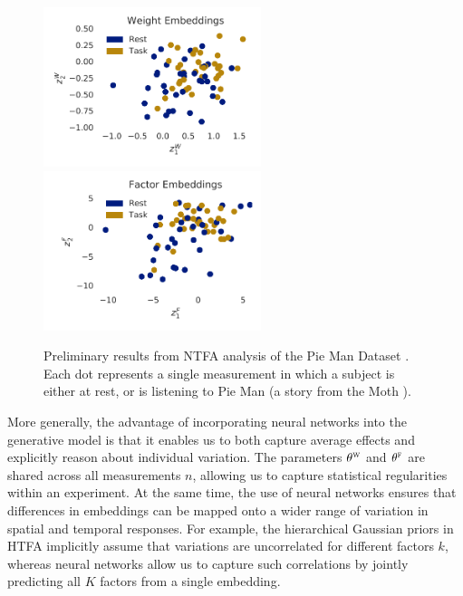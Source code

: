 \documentclass{article}
\newcommand{\scf}{\textsc{f}}
\newcommand{\scw}{\textsc{w}}
\begin{document}
\begin{figure}[!t]
    \begin{center}
    \includegraphics[width=2.5in]{figures/embedding_z_w_rest_intact.pdf}
    \hspace{4ex}
    \includegraphics[width=2.5in]{figures/embedding_z_f_rest_intact.pdf}
    \end{center}
    \vspace{-15pt}
    \caption{\label{fig:pieman} Preliminary results from NTFA analysis of the Pie Man Dataset \cite{simony2016dynamic}. Each dot represents a single measurement in which a subject is either at rest, or is listening to Pie Man (a story from the Moth \cite{pieman}).}
\end{figure}


More generally, the advantage of incorporating neural networks into the generative model is that it enables us to both capture average effects and explicitly reason about individual variation. The parameters $\theta^\scw$ and $\theta^\scf$ are shared across all measurements $n$, allowing us to capture statistical regularities within an experiment. At the same time, the use of neural networks ensures that differences in embeddings can be mapped onto a wider range of variation in spatial and temporal responses. For example, the  hierarchical Gaussian priors in HTFA implicitly assume that variations are uncorrelated for different factors $k$, whereas neural networks allow us to capture such correlations by jointly predicting all $K$ factors from a single embedding. 
\end{document}
